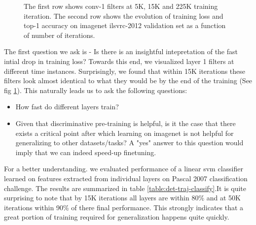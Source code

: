 \documentclass[runningheads]{llncs}
\begin{document}
\begin{figure}
\caption{The first row shows conv-1 filters at 5K, 15K and 225K training iteration. The second row shows the evolution of training loss and top-1 accuracy on imagenet ilsvrc-2012 validation set as a function of number of iterations.}
\label{fig:conv1}
\end{figure}

The first question we ask is - Is there is an insightful intepretation of the fast intial drop in training loss? Towards this end, we visualized layer 1 filters at different time instances. Surprisingly, we found that within 15K iterations these filters look almost identical to what they would be by the end of the training (See fig \ref{fig:conv1}). This naturally leads us to ask the following questions:
\begin{itemize}
\item {How fast do different layers train? }
\item {Given that discriminative pre-training is helpful, is it the case that there exists a critical point after which learning on imagenet is not helpful for generalizing to other datasets/tasks? A "yes" answer to this question would imply that we can indeed speed-up finetuning.}
\end{itemize}  

For a better understanding. we evaluated performance of a linear svm classifier learned on features extracted from individual layers on Pascal 2007 classification challenge. The results are summarized in table \ref{table:det-traj-classify}.It is quite surprising to note that by 15K iterations all layers are within 80\% and at 50K iterations within 90\% of there final performance. This strongly indicates that a great portion of training required for generalization happens quite quickly. 
\end{document}
